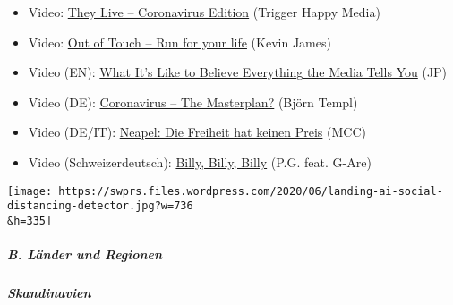 \begin{itemize}
\tightlist
\item
  Video: \href{https://archive.org/details/theylivecvversion}{They Live
  -- Coronavirus Edition} (Trigger Happy Media)
\item
  Video: \href{https://www.youtube.com/watch?v=wfGAktuU93s}{Out of Touch
  -- Run for your life} (Kevin James)
\item
  Video (EN): \href{https://www.youtube.com/watch?v=QcUAG6t5aN8}{What
  It's Like to Believe Everything the Media Tells You} (JP)
\item
  Video (DE):
  \href{http://www.nsfwyoutube.com/watch?v=81_xOIgoXkQ}{Coronavirus --
  The Masterplan?} (Björn Templ)
\item
  Video (DE/IT):
  \href{https://www.youtube.com/watch?v=qaXDC4AQR9s}{Neapel: Die
  Freiheit hat keinen Preis} (MCC)
\item
  Video (Schweizerdeutsch):
  \href{https://www.youtube.com/watch?v=L7KftkC9ctU}{Billy, Billy,
  Billy} (P.G. feat. G-Are)
\end{itemize}

\texttt{[image: https://swprs.files.wordpress.com/2020/06/landing-ai-social-distancing-detector.jpg?w=736\\\&h=335]}

\hypertarget{b-luxe4nder-und-regionen-1}{%
\subparagraph{\texorpdfstring{\textbf{B. Länder und
Regionen}}{B. Länder und Regionen}}\label{b-luxe4nder-und-regionen-1}}

\hypertarget{skandinavien}{%
\subparagraph{\texorpdfstring{\textbf{Skandinavien}}{Skandinavien}}\label{skandinavien}}

